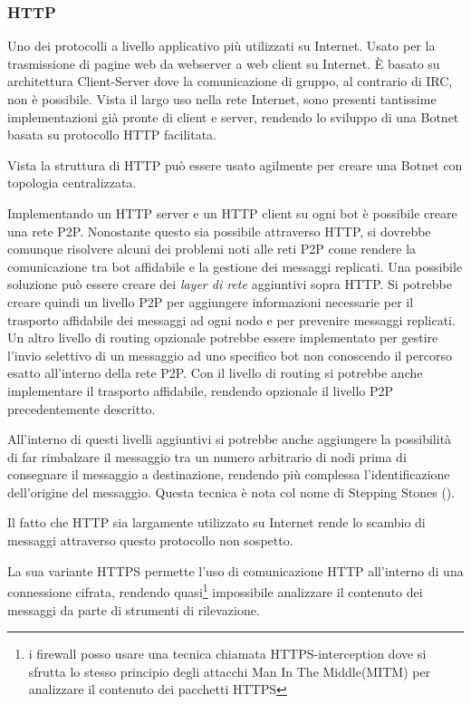 \subsubsection{HTTP}
\label{HTTP}
Uno dei protocolli a livello applicativo più utilizzati su Internet. Usato per la trasmissione di pagine web da webserver a web client su Internet. È basato su architettura Client-Server dove la comunicazione di gruppo, al contrario di IRC, non è possibile. Vista il largo uso nella rete Internet, sono presenti tantissime implementazioni già pronte di client e server, rendendo lo sviluppo di una Botnet basata su protocollo HTTP facilitata.

Vista la struttura di HTTP può essere usato agilmente per creare una Botnet con topologia centralizzata.

Implementando un HTTP server e un HTTP client su ogni bot è possibile creare una rete P2P.
Nonostante questo sia possibile attraverso HTTP, si dovrebbe comunque risolvere alcuni dei problemi noti alle reti P2P come rendere la comunicazione tra bot affidabile e la gestione dei messaggi replicati.
Una possibile soluzione può essere creare dei \textit{layer di rete}   aggiuntivi sopra HTTP.
Si potrebbe creare quindi un livello P2P per aggiungere informazioni necessarie per il trasporto affidabile dei messaggi ad ogni nodo e per prevenire messaggi replicati.
Un altro livello di routing opzionale potrebbe essere implementato per gestire l'invio selettivo di un messaggio ad uno specifico bot non conoscendo il percorso esatto all'interno della rete P2P. Con il livello di routing si potrebbe anche implementare il trasporto affidabile, rendendo opzionale il livello P2P precedentemente descritto.


All'interno di questi livelli aggiuntivi si potrebbe anche aggiungere la possibilità di far rimbalzare il messaggio tra un numero arbitrario di nodi prima di consegnare il messaggio a destinazione, rendendo più complessa l'identificazione dell'origine del messaggio. Questa tecnica è nota col nome di Stepping Stones ().

Il fatto che HTTP sia largamente utilizzato su Internet rende lo scambio di messaggi attraverso questo protocollo non sospetto.

La sua variante  HTTPS permette l'uso di comunicazione HTTP all'interno di una connessione cifrata, rendendo quasi\footnote{i firewall posso usare una tecnica chiamata HTTPS-interception dove si sfrutta lo stesso principio degli attacchi Man In The Middle(MITM)\footnotemark{}  per analizzare il contenuto dei pacchetti HTTPS} impossibile analizzare il contenuto dei messaggi da parte di strumenti di rilevazione.

